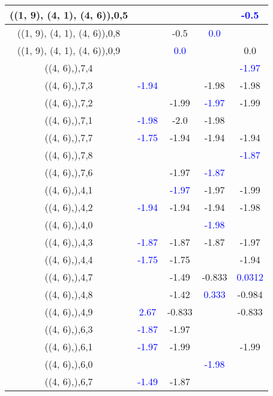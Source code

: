\documentclass{article}
\begin{document}
\begin{center}
\begin{longtable}{|c|c|c|c|c|}
        	\hline
        	((1, 9), (4, 1), (4, 6)),0,5&&&& \textcolor{blue}{-0.5}\\
        	\hline
        	((1, 9), (4, 1), (4, 6)),0,8&&-0.5& \textcolor{blue}{0.0}&\\
        	\hline
        	((1, 9), (4, 1), (4, 6)),0,9&& \textcolor{blue}{0.0}&&0.0\\
        	\hline
        	((4, 6),),7,4&&&& \textcolor{blue}{-1.97}\\
        	\hline
        	((4, 6),),7,3& \textcolor{blue}{-1.94}&&-1.98&-1.98\\
        	\hline
        	((4, 6),),7,2&&-1.99& \textcolor{blue}{-1.97}&-1.99\\
        	\hline
        	((4, 6),),7,1& \textcolor{blue}{-1.98}&-2.0&-1.98&\\
        	\hline
        	((4, 6),),7,7& \textcolor{blue}{-1.75}&-1.94&-1.94&-1.94\\
        	\hline
        	((4, 6),),7,8&&&& \textcolor{blue}{-1.87}\\
        	\hline
        	((4, 6),),7,6&&-1.97& \textcolor{blue}{-1.87}&\\
        	\hline
        	((4, 6),),4,1&& \textcolor{blue}{-1.97}&-1.97&-1.99\\
        	\hline
        	((4, 6),),4,2& \textcolor{blue}{-1.94}&-1.94&-1.94&-1.98\\
        	\hline
        	((4, 6),),4,0&&& \textcolor{blue}{-1.98}&\\
        	\hline
        	((4, 6),),4,3& \textcolor{blue}{-1.87}&-1.87&-1.87&-1.97\\
        	\hline
        	((4, 6),),4,4& \textcolor{blue}{-1.75}&-1.75&&-1.94\\
        	\hline
        	((4, 6),),4,7&&-1.49&-0.833& \textcolor{blue}{0.0312}\\
        	\hline
        	((4, 6),),4,8&&-1.42& \textcolor{blue}{0.333}&-0.984\\
        	\hline
        	((4, 6),),4,9& \textcolor{blue}{2.67}&-0.833&&-0.833\\
        	\hline
        	((4, 6),),6,3& \textcolor{blue}{-1.87}&-1.97&&\\
        	\hline
        	((4, 6),),6,1& \textcolor{blue}{-1.97}&-1.99&&-1.99\\
        	\hline
        	((4, 6),),6,0&&& \textcolor{blue}{-1.98}&\\
        	\hline
        	((4, 6),),6,7& \textcolor{blue}{-1.49}&-1.87&&\\
        	\hline

\end{longtable}
\end{center}
\end{document}
